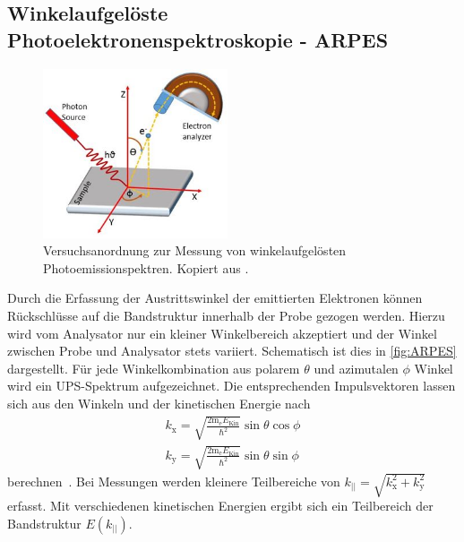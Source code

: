         \FloatBarrier
        \subsection{Winkelaufgelöste Photoelektronenspektroskopie - ARPES} \label{sec:ARPES}
            \begin{figure}
                \centering
                \includegraphics[height=5cm]{ARPES.jpg}
                \caption{Versuchsanordnung zur Messung von winkelaufgelösten Photoemissionspektren. Kopiert aus \cite{ARPES}.}
                \label{fig:ARPES}
            \end{figure}
            Durch die Erfassung der Austrittswinkel der emittierten Elektronen können Rückschlüsse auf die Bandstruktur innerhalb der Probe gezogen werden.
            Hierzu wird vom Analysator nur ein kleiner Winkelbereich akzeptiert und der Winkel zwischen Probe und Analysator stets variiert.
            Schematisch ist dies in \autoref{fig:ARPES} dargestellt.
            Für jede Winkelkombination aus polarem $\theta$ und azimutalen $\phi$ Winkel wird ein UPS-Spektrum aufgezeichnet.
            Die entsprechenden Impulsvektoren lassen sich aus den Winkeln und der kinetischen Energie nach
            \begin{gather}
                k_\text{x} = \sqrt{\frac{2 \text{m}_\text{e} E_\text{Kin}}{\hbar^2}} \sin\theta \cos\phi \\
                k_\text{y} = \sqrt{\frac{2 \text{m}_\text{e} E_\text{Kin}}{\hbar^2}} \sin\theta \sin\phi
            \end{gather}
            berechnen~\cite{MM_4}.
            Bei Messungen werden kleinere Teilbereiche von $k_\text{||} = \sqrt{k_\text{x}^2 + k_\text{y}^2}$ erfasst.
            Mit verschiedenen kinetischen Energien ergibt sich ein Teilbereich der Bandstruktur $E(k_\text{||})$.
